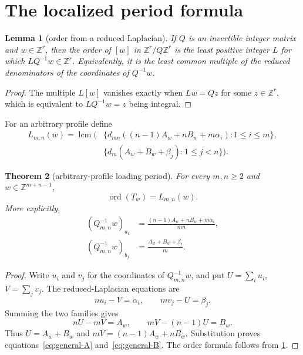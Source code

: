 \documentclass[11pt,a4paper]{amsart}
\newtheorem{theorem}{Theorem}[section]
\newtheorem{lemma}[theorem]{Lemma}
\theoremstyle{definition}
\theoremstyle{remark}
\newcommand{\Z}{\mathbb Z}
\newcommand{\ord}{\operatorname{ord}}
\newcommand{\lcmop}{\operatorname{lcm}}
\begin{document}
\section{The localized period formula}

\begin{lemma}[order from a reduced Laplacian]\label{lem:denominator}
If $Q$ is an invertible integer matrix and $w\in\Z^r$, then the order of
$[w]$ in $\Z^r/Q\Z^r$ is the least positive integer $L$ for which
$LQ^{-1}w\in\Z^r$.  Equivalently, it is the least common multiple of the
reduced denominators of the coordinates of $Q^{-1}w$.
\end{lemma}

\begin{proof}
The multiple $L[w]$ vanishes exactly when $Lw=Qz$ for some $z\in\Z^r$,
which is equivalent to $LQ^{-1}w=z$ being integral.
\end{proof}

For an arbitrary profile define
\begin{equation}\label{eq:general-period}
 \begin{split}
 L_{m,n}(w)=\lcmop\Big(&
 \{d_{mn}((n-1)A_w+nB_w+m\alpha_i):1\leq i\leq m\},\\
 &\{d_m(A_w+B_w+\beta_j):1\leq j<n\}\Big).
 \end{split}
\end{equation}

\begin{theorem}[arbitrary-profile loading period]\label{thm:general-period}
For every $m,n\geq2$ and $w\in\Z^{m+n-1}$,
\[
 \ord(T_w)=L_{m,n}(w).
\]
More explicitly,
\begin{align}
 (Q_{m,n}^{-1}w)_{a_i}
 &=\frac{(n-1)A_w+nB_w+m\alpha_i}{mn},\label{eq:general-A}\\
 (Q_{m,n}^{-1}w)_{b_j}
 &=\frac{A_w+B_w+\beta_j}{m}.\label{eq:general-B}
\end{align}
\end{theorem}

\begin{proof}
Write $u_i$ and $v_j$ for the coordinates of $Q_{m,n}^{-1}w$, and put
$U=\sum_i u_i$, $V=\sum_jv_j$.  The reduced-Laplacian equations are
\[
 nu_i-V=\alpha_i,\qquad mv_j-U=\beta_j.
\]
Summing the two families gives
\[
 nU-mV=A_w,\qquad mV-(n-1)U=B_w.
\]
Thus $U=A_w+B_w$ and
$mV=(n-1)A_w+nB_w$.  Substitution proves
equations~\eqref{eq:general-A} and~\eqref{eq:general-B}.  The order formula
follows from \cref{lem:denominator}.
\end{proof}
\end{document}
